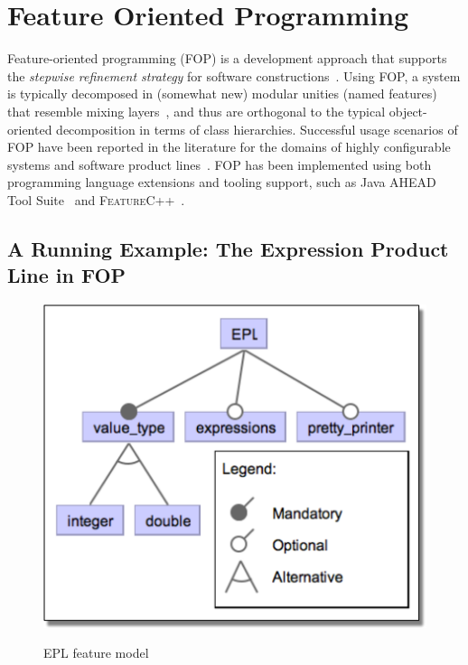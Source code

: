 \section{Feature Oriented Programming}\label{seq:fop}

Feature-oriented programming (FOP) is a development approach 
that supports the \emph{stepwise refinement strategy} for software 
constructions~\cite{batory-tse2004}. Using FOP, a system is 
typically decomposed in (somewhat new) modular unities 
(named features) that resemble mixing layers~\cite{bracha-ecoop1990}, 
and thus are orthogonal to the typical object-oriented 
decomposition in terms of class hierarchies. 
Successful usage scenarios of FOP have been reported in the literature 
for the domains of highly configurable systems and
software product lines~\cite{}.  
FOP has been implemented using both programming 
language extensions and tooling support, such as 
Java AHEAD Tool Suite~\cite{batory_feature-oriented_2004} and \textsc{FeatureC++}~\cite{apel_featurec++:_2005}. 

\subsection{A Running Example: The Expression Product Line in \ac{FOP}}

\begin{figure}
\centering
\includegraphics[scale=0.35]{doc/images/epl_fm}
\label{fig:epl_fm}
\caption{EPL feature model} 
\end{figure} 


